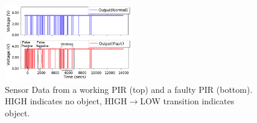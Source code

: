 
\begin{figure}
	\centering
	\includegraphics[width=0.5\textwidth]{figures/motivation/motivation-physics-technique.png}
	\caption{\footnotesize{Sensor Data} from a working PIR (top) and a faulty PIR (bottom). HIGH indicates no object, HIGH$\rightarrow$LOW transition indicates object.}
	\label{fig:occupancy_sensor_data}
\end{figure}

